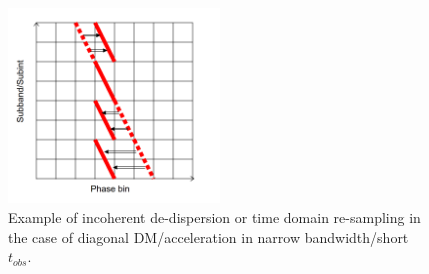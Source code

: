 \documentclass[thesis_msc.tex]{subfiles}
\begin{document}
    \begin{figure}[h!]
\centering
\includegraphics[width=0.5\textwidth]{figures/4bins.png}
\caption{Example of incoherent de-dispersion or time domain re-sampling in the case of diagonal DM/acceleration in narrow bandwidth/short $t_{obs}$.}\label{diag}
\end{figure}

     
     




\end{document}
